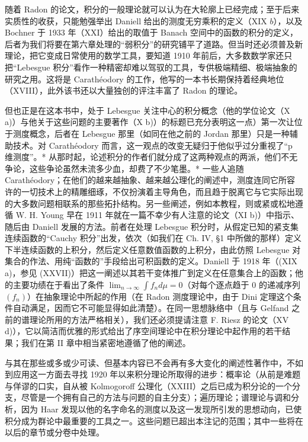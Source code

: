 随着 Radon 的论文，积分的一般理论就可以认为在大轮廓上已经完成；至于后来实质性的收获，只能勉强举出 Daniell 给出的测度无穷乘积的定义（XIX \(b\)），以及 Bochner 于 1933 年（XXI）给出的取值于 Banach 空间中的函数的积分的定义，后者为我们将要在第六章处理的“弱积分”的研究铺平了道路。但当时还必须普及新理论，把它变成日常使用的数学工具，要知道 1910 年前后，大多数数学家还只把“Lebesgue 积分”看作一种精密却难以驾驭的工具，专供极端精细、极端抽象的研究之用。这将是 Carathéodory 的工作，他写的一本书长期保持着经典地位（XVIII），此外该书还以大量独创的评注丰富了 Radon 的理论。

但也正是在这本书中，处于 Lebesgue 关注中心的积分概念（他的学位论文（X a)）与他关于这些问题的主要著作（X b)）的标题已充分表明这一点）第一次让位于测度概念，后者在 Lebesgue 那里（如同在他之前的 Jordan 那里）只是一种辅助技术。对 Carathéodory 而言，这一观点的改变无疑归于他似乎过分重视了“p 维测度”。* 从那时起，论述积分的作者们就分成了这两种观点的两派，他们不无争论，这些争论虽然未流多少血，却费了不少笔墨。* 一些人追随 Carathéodory；在他们的越来越抽象、越来越公理化的阐述中，测度连同它所容许的一切技术上的精雕细琢，不仅扮演着主导角色，而且趋于脱离它与它实际出现的大多数问题相联系的那些拓扑结构。另一些阐述，例如本教程，则或紧或松地遵循 W. H. Young 早在 1911 年就在一篇不幸少有人注意的论文（XI b)）中指示、随后由 Daniell 发展的方法。前者在处理 Lebesgue 积分时，从假定已知的紧支集连续函数的“Cauchy 积分”出发，依次（如我们在 Ch. IV, §1 中所做的那样）定义下半连续函数的上积分，然后定义任意数值函数的上积分，由此仿照 Lebesgue 对集合的作法、用纯“函数的”手段给出可积函数的定义。Daniell 于 1918 年（(XIX a)，参见 (XXVII)）把这一阐述以其若干变体推广到定义在任意集合上的函数；他的主要功绩在于看出了条件 \(\lim_{n\to \infty}\int f_n d\mu = 0\)（对每个逐点趋于 0 的递减序列 \((f_n)\)）在抽象理论中所起的作用（在 Radon 测度理论中，由于 Dini 定理这个条件自动满足，因而它不可能显得如此清楚）。在同一思想脉络中（且与 Gelfand 之前的谱理论所用的方法严格相关），我们还必须提请注意 F. Riesz 的论文（XV d)），它以简洁而优雅的形式给出了序空间理论中在积分理论中起作用的若干结果；我们在第 II 章中相当紧密地遵循了他的阐述。

与其在那些或多或少可读、但基本内容已不会再有多大变化的阐述性著作中，不如到应用这一方面去寻找 1920 年以来积分理论所取得的进步：概率论（从前是难题与佯谬的口实，自从被 Kolmogoroff 公理化（XXIII）之后已成为积分论的一个分支，尽管是一个拥有自己的方法与问题的自主分支）；遍历理论；谱理论与调和分析，因为 Haar 发现以他的名字命名的测度以及这一发现所引发的思想动向，已使积分成为群论中最重要的工具之一。这些问题已超出本注记的范围；其中一些将在以后的章节或分卷中处理。

